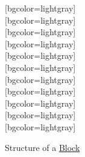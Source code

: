 \documentclass[11pt]{article}
\begin{document}
\begin{figure}[H]
\begin{bytefield}[bitwidth=2.5em]{16}
		[bgcolor=lightgray]{} \\
		[bgcolor=lightgray]{} \\
		[bgcolor=lightgray]{} \\
		[bgcolor=lightgray]{} \\
		[bgcolor=lightgray]{} \\
		[bgcolor=lightgray]{} \\
		[bgcolor=lightgray]{} \\
		[bgcolor=lightgray]{} \\
		[bgcolor=lightgray]{} \\
		[bgcolor=lightgray]{} \\
		[bgcolor=lightgray]{} \\
	\end{bytefield}
	\caption{Structure of a \hyperref[type:block]{Block}}
\end{figure}
\end{document}
